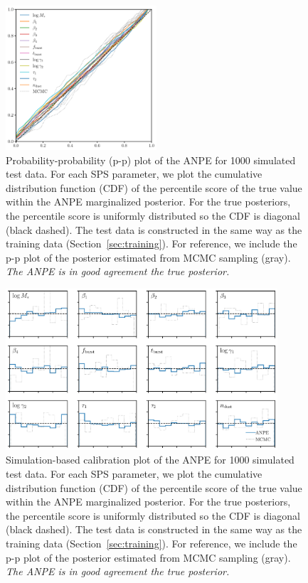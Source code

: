 \begin{figure}
\begin{center}
    \includegraphics[width=0.5\textwidth]{figs/ppplot.pdf}
    \caption{\label{fig:pp}
    Probability-probability (p-p) plot of the ANPE for 1000 simulated test data. 
    For each SPS parameter, we plot the cumulative distribution function (CDF) of the
    percentile score of the true value within the ANPE marginalized posterior.
    For the true posteriors, the percentile score is uniformly distributed so
    the CDF is diagonal (black dashed).
    The test data is constructed in the same way as the training data
    (Section~\ref{sec:training}). 
    For reference, we include the p-p plot of the posterior estimated from MCMC
    sampling (gray). 
    \emph{The ANPE is in good agreement the true posterior.}
    }
\end{center}
\end{figure}

\begin{figure}
\begin{center}
    \includegraphics[width=0.9\textwidth]{figs/sbc.pdf}
    \caption{\label{fig:sbc}
    Simulation-based calibration plot of the ANPE for 1000 simulated test data. 
    For each SPS parameter, we plot the cumulative distribution function (CDF) of the
    percentile score of the true value within the ANPE marginalized posterior.
    For the true posteriors, the percentile score is uniformly distributed so
    the CDF is diagonal (black dashed).
    The test data is constructed in the same way as the training data
    (Section~\ref{sec:training}). 
    For reference, we include the p-p plot of the posterior estimated from MCMC
    sampling (gray). 
    \emph{The ANPE is in good agreement the true posterior.}
    }
\end{center}
\end{figure}
